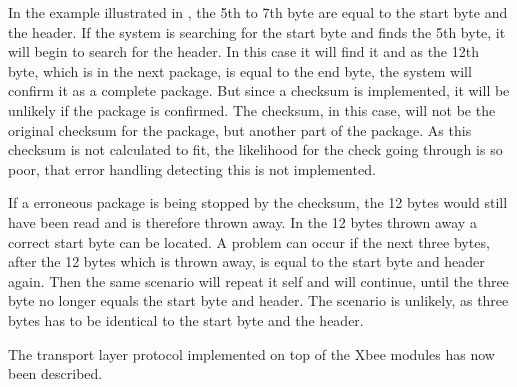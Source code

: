 In the example illustrated in , the 5th to 7th byte are equal to the start byte and the header. If the system is searching for the start byte and finds the 5th byte, it will begin to search for the header. In this case it will find it and as the 12th byte, which is in the next package, is equal to the end byte, the system will confirm it as a complete package. But since a checksum is implemented, it will be unlikely if the package is confirmed. The checksum, in this case, will not be the original checksum for the package, but another part of the package. As this checksum is not calculated to fit, the likelihood for the check going through is so poor, that error handling detecting this is not implemented. 

If a erroneous package is being stopped by the checksum, the 12 bytes would still have been read and is therefore thrown away. In the 12 bytes thrown away a correct start byte can be located. A problem can occur if the next three bytes, after the 12 bytes which is thrown away, is equal to the start byte and header again. Then the same scenario will repeat it self and will continue, until the three byte no longer equals the start byte and header. The scenario is unlikely, as three bytes has to be identical to the start byte and the header. 

The transport layer protocol implemented on top of the Xbee modules has now been described.

